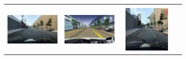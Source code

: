 \documentclass{VUMIFPSbakalaurinis}
\begin{document}
\begin{table}[H]
{\begin{tabular}{|c|c|c|c|}
            \hline
            \\
            \includegraphics[width=100,height=85]{img/original/7cf55c3d-9cbeb7c6} & 
            \includegraphics[width=100,height=85]{img/diffusion/controlnet/7cf55c3d-9cbeb7c6} & 
            \includegraphics[width=100,height=85]{img/diffusion/cycle/7cf55c3d-9cbeb7c6} & 

\end{tabular}}
\end{table}
\end{document}
